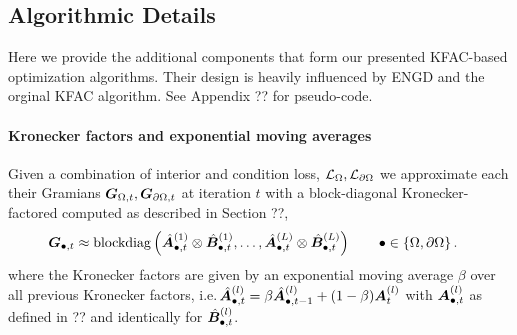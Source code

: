 \begin{comment}
    \subsection{Computational complexity}
\todo[inline]{what can we say? probably better to move to the respective approximations}
\begin{itemize}
    \item GN: $O(p^3+Np^2)$
    \item BFGS: $O(p^2+?)$
    \item L-BFGS: $O(mp+?)$?
    \item KFAC: $O(?)$
    \item
\end{itemize}
\end{comment}

\subsection{Algorithmic Details}

Here we provide the additional components that form our presented KFAC-based optimization algorithms.
Their design is heavily influenced by ENGD and the orginal KFAC algorithm.
See Appendix ?? for pseudo-code.

\paragraph{Kronecker factors and exponential moving averages} Given a combination of interior and condition loss, ${\mathcal{L}}_{\Omega},{\mathcal{L}}_{\partial\Omega}$ we approximate each their Gramians ${\bm{G}}_{\Omega,t}, {\bm{G}}_{\partial \Omega, t}$ at iteration $t$ with a block-diagonal Kronecker-factored computed as described in Section ??,
\begin{align*}
  {\bm{G}}_{\bullet, t}
  &\approx
    \operatorname{blockdiag}
    \left(
    \hat{{\bm{A}}}^{(1)}_{\bullet,t} \otimes \hat{{\bm{B}}}_{\bullet,t}^{(1)},
    \dots,
    \hat{{\bm{A}}}^{(L)}_{\bullet,t} \otimes \hat{{\bm{B}}}_{\bullet,t}^{(L)}
    \right)
    \qquad \bullet \in \{ \Omega, \partial\Omega\}\,.
\end{align*}
where the Kronecker factors are given by an exponential moving average $\beta$ over all previous Kronecker factors, i.e.\,$\hat{{\bm{A}}}^{(l)}_{\bullet,t} = \beta \hat{{\bm{A}}}^{(l)}_{\bullet,t-1} + (1 - \beta) {\bm{A}}^{(l)}_t$ with ${\bm{A}}^{(l)}_{\bullet, t}$ as defined in ?? and identically for $\hat{{\bm{B}}}^{(l)}_{\bullet, t}$.

